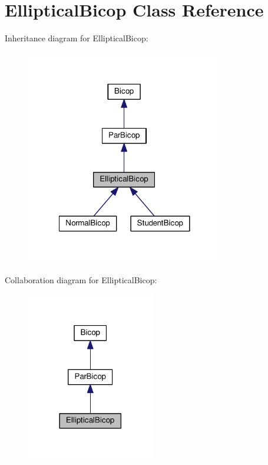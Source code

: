 \hypertarget{class_elliptical_bicop}{\section{Elliptical\+Bicop Class Reference}
\label{class_elliptical_bicop}
}


Inheritance diagram for Elliptical\+Bicop\+:
\nopagebreak
\begin{figure}[H]
\begin{center}
\leavevmode
\includegraphics[width=245pt]{class_elliptical_bicop__inherit__graph}
\end{center}
\end{figure}


Collaboration diagram for Elliptical\+Bicop\+:
\nopagebreak
\begin{figure}[H]
\begin{center}
\leavevmode
\includegraphics[width=158pt]{class_elliptical_bicop__coll__graph}
\end{center}
\end{figure}

